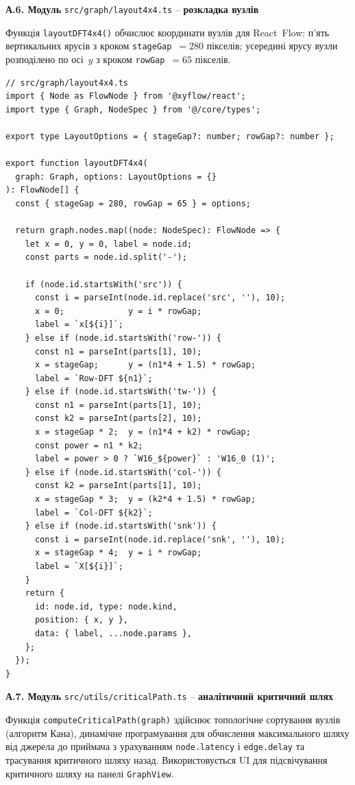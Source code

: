\documentclass[
]{article}
\begin{document}
\textbf{А.6. Модуль} \texttt{src/graph/layout4x4.ts} -- \textbf{розкладка
вузлів}

Функція \texttt{layoutDFT4x4()} обчислює координати вузлів для
React~Flow: п'ять вертикальних ярусів з кроком \texttt{stageGap}~\(=
280\) пікселів; усередині ярусу вузли розподілено по осі~\(y\) з кроком
\texttt{rowGap}~\(= 65\) пікселів.

\begin{verbatim}
// src/graph/layout4x4.ts
import { Node as FlowNode } from '@xyflow/react';
import type { Graph, NodeSpec } from '@/core/types';

export type LayoutOptions = { stageGap?: number; rowGap?: number };

export function layoutDFT4x4(
  graph: Graph, options: LayoutOptions = {}
): FlowNode[] {
  const { stageGap = 280, rowGap = 65 } = options;

  return graph.nodes.map((node: NodeSpec): FlowNode => {
    let x = 0, y = 0, label = node.id;
    const parts = node.id.split('-');

    if (node.id.startsWith('src')) {
      const i = parseInt(node.id.replace('src', ''), 10);
      x = 0;             y = i * rowGap;
      label = `x[${i}]`;
    } else if (node.id.startsWith('row-')) {
      const n1 = parseInt(parts[1], 10);
      x = stageGap;      y = (n1*4 + 1.5) * rowGap;
      label = `Row-DFT ${n1}`;
    } else if (node.id.startsWith('tw-')) {
      const n1 = parseInt(parts[1], 10);
      const k2 = parseInt(parts[2], 10);
      x = stageGap * 2;  y = (n1*4 + k2) * rowGap;
      const power = n1 * k2;
      label = power > 0 ? `W16_${power}` : 'W16_0 (1)';
    } else if (node.id.startsWith('col-')) {
      const k2 = parseInt(parts[1], 10);
      x = stageGap * 3;  y = (k2*4 + 1.5) * rowGap;
      label = `Col-DFT ${k2}`;
    } else if (node.id.startsWith('snk')) {
      const i = parseInt(node.id.replace('snk', ''), 10);
      x = stageGap * 4;  y = i * rowGap;
      label = `X[${i}]`;
    }
    return {
      id: node.id, type: node.kind,
      position: { x, y },
      data: { label, ...node.params },
    };
  });
}
\end{verbatim}

\textbf{А.7. Модуль} \texttt{src/utils/criticalPath.ts} --
\textbf{аналітичний критичний шлях}

Функція \texttt{computeCriticalPath(graph)} здійснює топологічне
сортування вузлів (алгоритм Кана), динамічне програмування для
обчислення максимального шляху від джерела до приймача з урахуванням
\texttt{node.latency} і \texttt{edge.delay} та трасування критичного
шляху назад. Використовується UI для підсвічування критичного шляху на
панелі \texttt{GraphView}.
\end{document}
